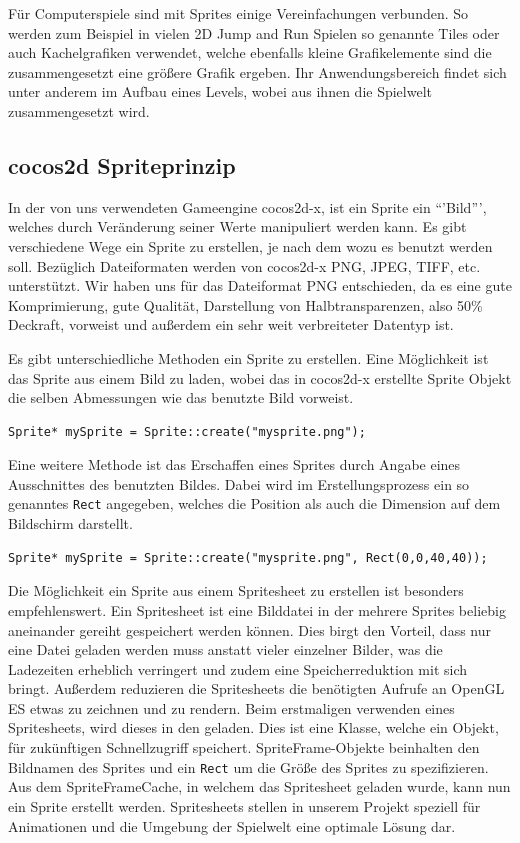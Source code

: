 Für Computerspiele sind mit Sprites einige Vereinfachungen verbunden. So werden zum Beispiel in vielen 2D Jump and Run Spielen so genannte Tiles oder auch Kachelgrafiken verwendet, welche ebenfalls kleine Grafikelemente sind die zusammengesetzt eine größere Grafik ergeben. Ihr Anwendungsbereich findet sich unter anderem im Aufbau eines Levels, wobei aus ihnen die Spielwelt zusammengesetzt wird.

\subsection{cocos2d Spriteprinzip}
In der von uns verwendeten Gameengine cocos2d-x, ist ein Sprite ein “'Bild”', welches durch Veränderung seiner Werte manipuliert werden kann. Es gibt verschiedene Wege ein Sprite zu erstellen, je nach dem wozu es benutzt werden soll. Bezüglich Dateiformaten werden von cocos2d-x PNG, JPEG, TIFF, etc. unterstützt. Wir haben uns für das Dateiformat PNG entschieden, da es eine gute Komprimierung, gute Qualität, Darstellung von Halbtransparenzen, also 50\% Deckraft, vorweist und außerdem ein sehr weit verbreiteter Datentyp ist.

Es gibt unterschiedliche Methoden ein Sprite zu erstellen. Eine Möglichkeit ist das Sprite aus einem Bild zu laden, wobei das in cocos2d-x erstellte Sprite Objekt die selben Abmessungen wie das benutzte Bild vorweist. 

\begin{lstlisting}[style=singleline]
Sprite* mySprite = Sprite::create("mysprite.png");
\end{lstlisting}

Eine weitere Methode ist das Erschaffen eines Sprites durch Angabe eines Ausschnittes des benutzten Bildes. Dabei wird im Erstellungsprozess ein so genanntes \texttt{Rect} angegeben, welches die Position als auch die Dimension auf dem Bildschirm darstellt. 

\begin{lstlisting}[style=singleline]
Sprite* mySprite = Sprite::create("mysprite.png", Rect(0,0,40,40));
\end{lstlisting}

Die Möglichkeit ein Sprite aus einem Spritesheet zu erstellen ist besonders empfehlenswert. Ein Spritesheet ist eine Bilddatei in der mehrere Sprites beliebig aneinander gereiht gespeichert werden können. Dies birgt den Vorteil, dass nur eine Datei geladen werden muss anstatt vieler einzelner Bilder, was die Ladezeiten erheblich verringert und zudem eine Speicherreduktion mit sich bringt. Außerdem reduzieren die Spritesheets die benötigten Aufrufe an OpenGL ES etwas zu zeichnen und zu rendern. Beim erstmaligen verwenden eines Spritesheets, wird dieses in den  geladen. Dies ist eine Klasse, welche ein  Objekt, für zukünftigen Schnellzugriff speichert. SpriteFrame-Objekte beinhalten den Bildnamen des Sprites und ein \texttt{Rect} um die Größe des Sprites zu spezifizieren. Aus dem SpriteFrameCache, in welchem das Spritesheet geladen wurde, kann nun ein Sprite erstellt werden.
Spritesheets stellen in unserem Projekt speziell für Animationen und die Umgebung der Spielwelt eine optimale Lösung dar. 



